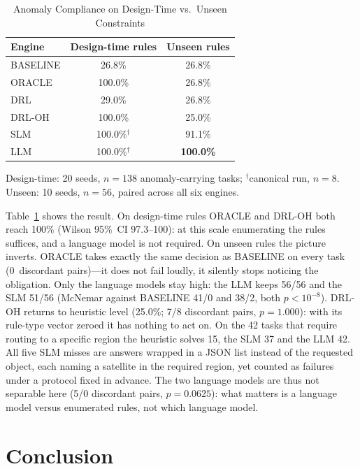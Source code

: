 \documentclass[conference,comsoc,twoside,caption=false]{IEEEtran}
\let\MYoriglatexcaption\caption
\renewcommand{\caption}[2][\relax]{\MYoriglatexcaption[#2]{#2}}
\theoremstyle{definition}
\begin{document}
\begin{table}[!t]
\centering
\caption{Anomaly Compliance on Design-Time vs.\ Unseen Constraints}
\label{tab:generalization}
\footnotesize
\begin{tabular}{lcc}
\toprule
\textbf{Engine} & \textbf{Design-time rules} & \textbf{Unseen rules} \\
\midrule
BASELINE & 26.8\% & 26.8\% \\
ORACLE   & 100.0\% & 26.8\% \\
DRL      & 29.0\% & 26.8\% \\
DRL-OH   & 100.0\% & 25.0\% \\
SLM      & 100.0\%$^{\dagger}$ & 91.1\% \\
LLM      & 100.0\%$^{\dagger}$ & \textbf{100.0\%} \\
\bottomrule
\end{tabular}

{\scriptsize
Design-time: 20 seeds, $n=138$ anomaly-carrying tasks;
$^{\dagger}$canonical run, $n=8$. Unseen: 10 seeds, $n=56$, paired across all
six engines.}
\end{table}

Table~\ref{tab:generalization} shows the result. On design-time rules ORACLE and
DRL-OH both reach 100\% (Wilson 95\%~CI 97.3--100): at this scale enumerating
the rules suffices, and a language model is not required. On unseen rules the
picture inverts. ORACLE takes exactly the same decision as BASELINE on every task
(0~discordant pairs)---it does not fail loudly, it silently stops noticing the
obligation. Only the language models stay high: the LLM keeps 56/56 and the SLM
51/56 (McNemar against BASELINE 41/0 and 38/2, both $p<10^{-8}$). DRL-OH returns
to heuristic level (25.0\%; 7/8 discordant pairs, $p=1.000$): with its rule-type
vector zeroed it has nothing to act on. On the 42 tasks that require routing to a
specific region the heuristic solves 15, the SLM 37 and the LLM 42. All five SLM
misses are answers wrapped in a JSON list instead of the requested object, each
naming a satellite in the required region, yet counted as failures under a
protocol fixed in advance. The two language models are thus not separable here
(5/0 discordant pairs, $p=0.0625$): what matters is a language model versus
enumerated rules, not which language model.

\section{Conclusion}
\label{sec:conclusion}
\end{document}

